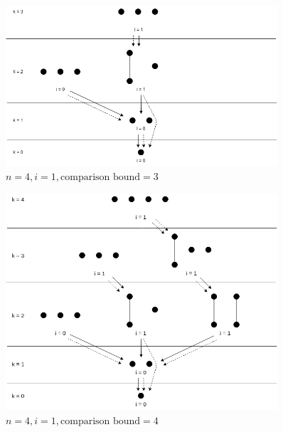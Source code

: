 \begin{frame}{\insertsection}

  \begin{figure}[!b]
    \centering
    \includegraphics[width=0.9\textwidth,height=0.67\textheight,keepaspectratio]{./figures/backward-searchtree-bound3.png}
    \caption{$n=4,i=1,\text{comparison bound}=3$}
    \label{fig:backward-searchtree-bound3}
  \end{figure}
\end{frame}

\begin{frame}{\insertsection}
  \begin{figure}[!b]
    \centering
    \includegraphics[width=0.9\textwidth,height=0.67\textheight,keepaspectratio]{./figures/backward-searchtree-bound4.png}
    \caption{$n=4,i=1,\text{comparison bound}=4$}
    \label{fig:backward-searchtree-bound4}
  \end{figure}

\end{frame}

